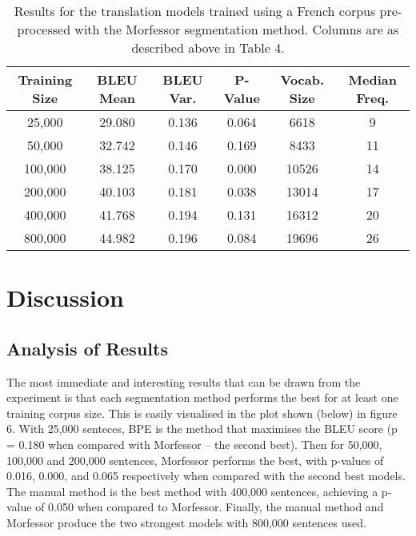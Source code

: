 \documentclass[11pt]{article}
\begin{document}
\begin{table}[h]
\centering
\begin{tabular}{|c|c|c|c|c|c|}
\hline
Training Size & BLEU Mean & BLEU Var. & P-Value & Vocab. Size & Median Freq. \\ \hline
25,000        & 29.080    & 0.136     & 0.064   & 6618        & 9            \\
50,000        & 32.742    & 0.146     & 0.169   & 8433        & 11           \\
100,000       & 38.125    & 0.170     & 0.000   & 10526       & 14           \\
200,000       & 40.103    & 0.181     & 0.038   & 13014       & 17           \\
400,000       & 41.768    & 0.194     & 0.131   & 16312       & 20           \\
800,000       & 44.982    & 0.196     & 0.084   & 19696       & 26           \\ \hline
\end{tabular}
\caption{Results for the translation models trained using a French corpus pre-processed with the Morfessor segmentation method. Columns are as described above in Table 4.}
\label{tab:morfessor}
\end{table}

\newpage

\section{Discussion}

\subsection{Analysis of Results}

The most immediate and interesting results that can be drawn from the experiment is that each segmentation method performs the best for at least one training corpus size. This is easily visualised in the plot shown (below) in figure 6. With 25,000 senteces, BPE is the method that maximises the BLEU score (p = 0.180 when compared with Morfessor -- the second best). Then for 50,000, 100,000 and 200,000 sentences, Morfessor performs the best, with p-values of 0.016, 0.000, and 0.065 respectively when compared with the second best models. The manual method is the best method with 400,000 sentences, achieving a p-value of 0.050 when compared to Morfessor. Finally, the manual method and Morfessor produce the two strongest models with 800,000 sentences used.
\end{document}
